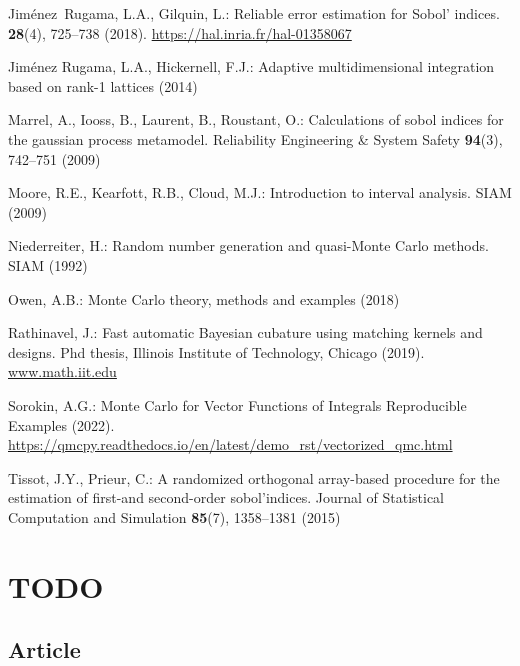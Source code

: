 \documentclass[graybox]{svmult}
\begin{document}
\begin{thebibliography}{10}
Jim{\'e}nez~Rugama, L.A., Gilquin, L.: {Reliable error estimation for Sobol'
  indices}.
 \textbf{28}(4), 725--738 (2018).
\newblock \urlprefix\url{https://hal.inria.fr/hal-01358067}

{Jim\'enez Rugama}, L.A., Hickernell, F.J.: Adaptive multidimensional
  integration based on rank-1 lattices (2014)

Marrel, A., Iooss, B., Laurent, B., Roustant, O.: Calculations of sobol indices
  for the gaussian process metamodel.
\newblock Reliability Engineering \& System Safety \textbf{94}(3), 742--751
  (2009)

Moore, R.E., Kearfott, R.B., Cloud, M.J.: Introduction to interval analysis.
\newblock SIAM (2009)

Niederreiter, H.: Random number generation and quasi-Monte Carlo methods.
\newblock SIAM (1992)

Owen, A.B.: Monte Carlo theory, methods and examples (2018)

Rathinavel, J.: {F}ast automatic {B}ayesian cubature using matching kernels and
  designs.
\newblock Phd thesis, Illinois Institute of Technology, Chicago (2019).
\newblock \urlprefix\url{www.math.iit.edu}

Sorokin, A.G.: {M}onte {C}arlo for {V}ector {F}unctions of {I}ntegrals
  {R}eproducible {E}xamples (2022).
\newblock \urlprefix\url{https://qmcpy.readthedocs.io/en/latest/demo\_rst/vectorized\_qmc.html}

Tissot, J.Y., Prieur, C.: A randomized orthogonal array-based procedure for the
  estimation of first-and second-order sobol'indices.
\newblock Journal of Statistical Computation and Simulation \textbf{85}(7),
  1358--1381 (2015)

\end{thebibliography}


\iffalse
\section*{TODO}

\subsection*{Article}
\end{document}
